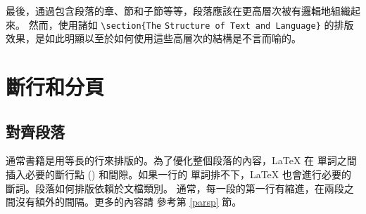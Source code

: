 最後，通過包含段落的章、節和子節等等，段落應該在更高層次被有邏輯地組織起來。
然而，使用諸如 \verb|\section{The| \texttt{Structure of Text and
Language}\verb|}| 的排版效果，是如此明顯以至於如何使用這些高層次的結構是不言而喻的。


%
\section{斷行和分頁}

\subsection{對齊段落}

通常書籍是用等長的行來排版的。為了優化整個段落的內容，\LaTeX{} 在
單詞之間插入必要的斷行點 () 和間隙。如果一行的
單詞排不下，\LaTeX{} 也會進行必要的斷詞。段落如何排版依賴於文檔類別。
通常，每一段的第一行有縮進，在兩段之間沒有額外的間隔。更多的內容請
參考第 \ref{parsp} 節。


